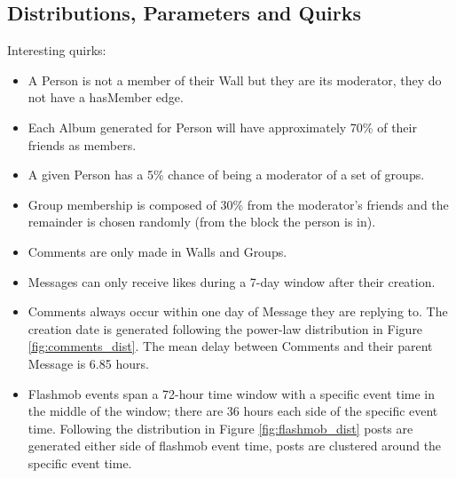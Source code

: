 \subsection{Distributions, Parameters and Quirks}
\label{sec:distr-param}

Interesting quirks:
\begin{itemize}
\item A Person is not a member of their Wall but they are its moderator, they do not have a hasMember edge.
\item Each Album generated for Person will have approximately 70\% of their friends as members.
\item A given Person has a 5\% chance of being a moderator of a set of groups.
\item Group membership is composed of 30\% from the moderator's friends and the remainder is chosen randomly (from the block the person is in).
\item Comments are only made in Walls and Groups.
\item Messages can only receive likes during a 7-day window after their creation.
\item Comments always occur within one day of Message they are replying to. The creation date is generated following the power-law distribution in Figure \ref{fig:comments_dist}. The mean delay between Comments and their parent Message is 6.85 hours.
\item Flashmob events span a 72-hour time window with a specific event time in the middle of the window; there are 36 hours each side of the specific event time. Following the distribution in Figure \ref{fig:flashmob_dist} posts are generated either side of flashmob event time, posts are clustered around the specific event time.
\end{itemize}

